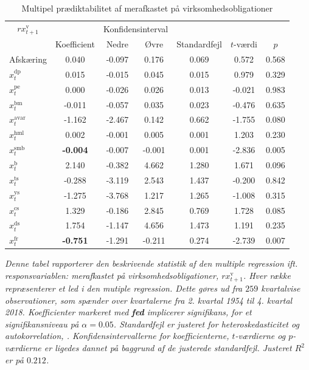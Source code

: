 \documentclass[
  a4paper,
  oneside]{memoir}
\begin{document}
\begin{table}[H]

\caption{\label{tab:MULT-v}Multipel prædiktabilitet af merafkastet på virksomhedsobligationer}
\centering
\begin{threeparttable}
\begin{tabular}[t]{lcccccc}
\toprule
\multicolumn{1}{c}{$rx_{t+1}^{\text{v}}$} & \multicolumn{1}{c}{ } & \multicolumn{2}{c}{Konfidensinterval} & \multicolumn{3}{c}{ } \\
\cmidrule(l{3pt}r{3pt}){1-1} \cmidrule(l{3pt}r{3pt}){3-4}
  & Koefficient & Nedre & Øvre & Standardfejl & $t$-værdi & $p$\\
\midrule
\rowcolor{gray!6}  Afskæring & 0.040 & -0.097 & 0.176 & 0.069 & 0.572 & 0.568\\
$x_t^{\text{dp}}$ & 0.015 & -0.015 & 0.045 & 0.015 & 0.979 & 0.329\\
\rowcolor{gray!6}  $x_t^{\text{pe}}$ & 0.000 & -0.026 & 0.026 & 0.013 & -0.021 & 0.983\\
$x_t^{\text{bm}}$ & -0.011 & -0.057 & 0.035 & 0.023 & -0.476 & 0.635\\
\rowcolor{gray!6}  $x_t^{\text{avar}}$ & -1.162 & -2.467 & 0.142 & 0.662 & -1.755 & 0.080\\
$x_t^{\text{hml}}$ & 0.002 & -0.001 & 0.005 & 0.001 & 1.203 & 0.230\\
\rowcolor{gray!6}  $x_t^{\text{smb}}$ & \textbf{-0.004} & -0.007 & -0.001 & 0.001 & -2.836 & 0.005\\
$x_t^{\text{b}}$ & 2.140 & -0.382 & 4.662 & 1.280 & 1.671 & 0.096\\
\rowcolor{gray!6}  $x_t^{\text{ts}}$ & -0.288 & -3.119 & 2.543 & 1.437 & -0.200 & 0.842\\
$x_t^{\text{ys}}$ & -1.275 & -3.768 & 1.217 & 1.265 & -1.008 & 0.315\\
\rowcolor{gray!6}  $x_t^{\text{cs}}$ & 1.329 & -0.186 & 2.845 & 0.769 & 1.728 & 0.085\\
$x_t^{\text{ds}}$ & 1.754 & -1.147 & 4.656 & 1.473 & 1.191 & 0.235\\
\rowcolor{gray!6}  $x_t^{\text{fr}}$ & \textbf{-0.751} & -1.291 & -0.211 & 0.274 & -2.739 & 0.007\\
\bottomrule
\end{tabular}
\begin{tablenotes}
\item \textit{Denne tabel rapporterer den beskrivende statistik af den multiple regression ift. responsvariablen: merafkastet på virksomhedsobligationer, $rx_{t+1}^{\text{v}}$. Hver række repræsenterer et led i den mutiple regression. Dette gøres ud fra $259$ kvartalvise observationer, som spænder over kvartalerne fra 2. kvartal 1954 til 4. kvartal 2018. Koefficienter markeret med \textbf{fed} implicerer signifikans, for et signifikansniveau på $\alpha=0.05$. Standardfejl er justeret for heteroskedasticitet og autokorrelation, \citep{Newey1987}. Konfidensintervallerne for koefficienterne, $t$-værdierne og $p$-værdierne er ligedes dannet på baggrund af de justerede standardfejl. Justeret $R^2$ er på $0.212$.}
\end{tablenotes}
\end{threeparttable}
\end{table}
\end{document}
